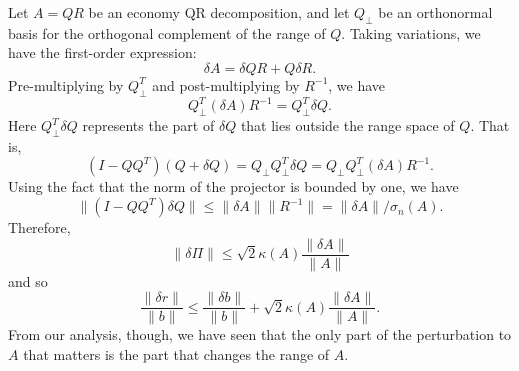 Let $A = QR$ be an economy QR decomposition, and let $Q_\perp$ be an
orthonormal basis for the orthogonal complement of the range of $Q$.
Taking variations, we have the first-order expression:
\[
  \delta A = \delta Q R + Q \delta R.
\]
Pre-multiplying by $Q_\perp^T$ and post-multiplying by $R^{-1}$, we have
\[
  Q_\perp^T (\delta A) R^{-1} = Q_{\perp}^T \delta Q.
\]
Here $Q_{\perp}^T \delta Q$ represents the part of $\delta Q$ that
lies outside the range space of $Q$.  That is,
\[
  (I-QQ^T) (Q+\delta Q)
  = Q_\perp Q_\perp^T \delta Q
  = Q_\perp Q_\perp^T (\delta A) R^{-1}.
\]
Using the fact that the norm of the projector is bounded by one,
we have
\[
  \|(I-QQ^T) \delta Q\|
    \leq \|\delta A\| \|R^{-1}\|
    = \|\delta A\|/\sigma_n(A).
\]
Therefore,
\[
  \|\delta \Pi\| \leq \sqrt{2} \kappa(A) \frac{\|\delta A\|}{\|A\|}
\]
and so
\[
  \frac{\|\delta r\|}{\|b\|} \leq
  \frac{\|\delta b\|}{\|b\|} +
  \sqrt{2} \kappa(A) \frac{\|\delta A\|}{\|A\|}.
\]
From our analysis, though, we have seen that the only part of the
perturbation to $A$ that matters is the part that changes the range
of $A$.
